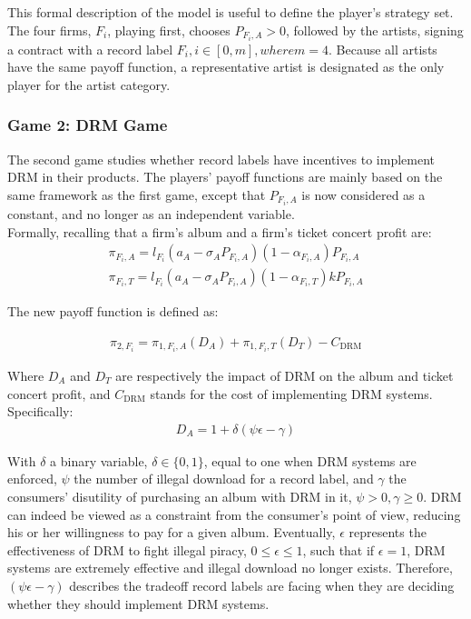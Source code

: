 \documentclass[a4paper,12pt]{article}
\numberwithin{equation}{section}
\newcommand{\drm}{\text{DRM}}
\newcommand{\firmpayoff}[2]{\pi_{{#1}, F_{#2}}}
\newcommand{\firmalbum}[2]{\pi_{#1, F_{#2}, A}}
\newcommand{\firmticket}[2]{\pi_{#1, F_{#2}, T}}
\newcommand{\drminf}{(\psi \epsilon - \gamma)}
\begin{document}
This formal description of the model is useful to define the player’s strategy set. The four firms, $F_i$, playing first, chooses $P_{F_i, A} > 0$, followed by the artists, signing a contract with a record label $F_i, i \in [0, m], where m = 4$. Because all artists have the same payoff function, a representative artist is designated as the only player for the artist category. 

\subsubsection{Game 2: DRM Game}

The second game studies whether record labels have incentives to implement DRM in their products. The players’ payoff functions are mainly based on the same framework as the first game, except that $P_{F_i, A}$ is now considered as a constant, and no longer as an independent variable.\\

Formally, recalling that a firm’s album and a firm’s ticket concert profit are:
\begin{eqnarray}
\pi_{F_i, A} = l_{F_i} (a_A - \sigma_A P_{F_i, A})(1 - \alpha_{F_i, A}) P_{F_i, A}\\
\pi_{F_i, T} = l_{F_i} (a_A - \sigma_A P_{F_i, A})(1 - \alpha_{F_i, T}) k P_{F_i, A}
\end{eqnarray}

The new payoff function is defined as:

\begin{eqnarray}
\firmpayoff{2}{i} = \firmalbum{1}{i} (D_A) + \firmticket{1}{i}  (D_T) - C_{\drm}
\label{Eq:FirmTotalPayoffDRM}
\end{eqnarray}

Where $D_A$ and $D_T$ are respectively the impact of DRM on the album and ticket concert profit, and $C_{\drm}$ stands for the cost of implementing DRM systems. Specifically:
\begin{eqnarray}
D_A = 1 + \delta \drminf
\label{Eq:DA}
\end{eqnarray}

With $\delta$ a binary variable, $\delta \in \{0, 1\}$, equal to one when DRM systems are enforced, $\psi$ the number of illegal download for a record label, and $\gamma$ the consumers’ disutility of purchasing an album with DRM in it, $\psi > 0, \gamma \geq 0$. DRM can indeed be viewed as a constraint from the consumer’s point of view, reducing his or her willingness to pay for a given album. Eventually, $\epsilon$ represents the effectiveness of DRM to fight illegal piracy, $0 \leq \epsilon \leq 1$, such that if $\epsilon = 1$, DRM systems are extremely effective and illegal download no longer exists. Therefore, $\drminf$ describes the tradeoff record labels are facing when they are deciding whether they should implement DRM systems.\\
\end{document}
